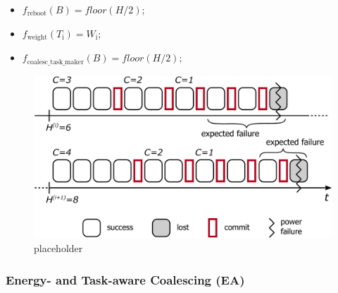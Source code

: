 \begin{itemize}
\item $f_\text{reboot}(B) = floor(H / 2);$
\item $f_\text{weight}(T_\text{i}) =  W_\text{i}$; 
\item $f_\text{coalesc\_task\_maker}(B) = floor(H / 2);$ 
\end{itemize}

\begin{figure}
	\centering
	\includegraphics[width=0.5\columnwidth]{figures/energy-aware-coal.pdf}
	\caption{placeholder}
	\label{fig:energyAware}
\end{figure}


\subsubsection{Energy- and Task-aware Coalescing (EA)}
\label{subsec:energyTaskAware}





























